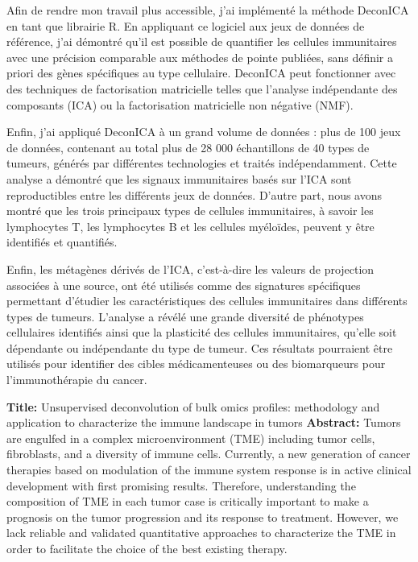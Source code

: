 \documentclass[12pt,]{book}
\theoremstyle{definition}
\theoremstyle{definition}
\theoremstyle{definition}
\theoremstyle{remark}
\begin{document}
\begin{titlepage}
Afin de rendre mon travail plus accessible, j'ai implémenté la méthode DeconICA en tant que librairie R. En appliquant ce logiciel aux jeux de données de référence, j'ai démontré qu’il est possible de quantifier les cellules immunitaires avec une précision comparable aux méthodes de pointe publiées, sans définir a priori des gènes spécifiques au type cellulaire. DeconICA peut fonctionner avec des techniques de factorisation matricielle telles que l'analyse indépendante des composants (ICA) ou la factorisation matricielle non négative (NMF).

Enfin, j’ai appliqué DeconICA à un grand volume de données : plus de 100 jeux de données, contenant au total plus de 28 000 échantillons de 40 types de tumeurs, générés par différentes technologies et traités indépendamment. Cette analyse a démontré que les signaux immunitaires basés sur l'ICA sont reproductibles entre les différents jeux de données. D’autre part, nous avons montré que les trois principaux types de cellules immunitaires, à savoir les lymphocytes T, les lymphocytes B et les cellules myéloïdes, peuvent y être identifiés et quantifiés.

Enfin, les métagènes dérivés de l'ICA, c’est-à-dire les valeurs de projection associées à une source, ont été utilisés comme des signatures spécifiques permettant d’étudier les caractéristiques des cellules immunitaires dans différents types de tumeurs. L'analyse a révélé une grande diversité de phénotypes cellulaires identifiés ainsi que la plasticité des cellules immunitaires, qu’elle soit dépendante ou indépendante du type de tumeur. Ces résultats pourraient être utilisés pour identifier des cibles médicamenteuses ou des biomarqueurs pour l'immunothérapie du cancer.

\vskip 1cm
\noindent
\textbf{Title: }
Unsupervised deconvolution of bulk omics profiles: methodology and application to characterize the immune landscape in tumors\vskip 1cm
\noindent
\textbf{Abstract:}
Tumors are engulfed in a complex microenvironment (TME) including tumor cells, fibroblasts, and a diversity of immune cells. Currently, a new generation of cancer therapies based on modulation of the immune system response is in active clinical development with first promising results. Therefore, understanding the composition of TME in each tumor case is critically important to make a prognosis on the tumor progression and its response to treatment. However, we lack reliable and validated quantitative approaches to characterize the TME in order to facilitate the choice of the best existing therapy. 


\end{titlepage}
\end{document}
